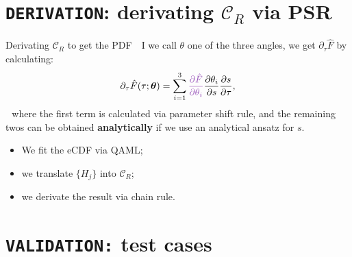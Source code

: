 \documentclass[8pt, xcolor={svgnames}, hyperref={colorlinks, linkcolor=black, citecolor=amethyst, urlcolor=amethyst}]{beamer}
\begin{document}
\section{\texttt{DERIVATION}: derivating $\mathcal{C}_R$ via PSR}


\begin{frame}{Derivating $\mathcal{C}_R$ to get the PDF}
\large
\faArrowCircleRight\,\, I we call $\theta$ one of the three angles, we get
$\partial_{\tau} \hat{F}$ by calculating:
\begin{equation}
  \partial_{\tau} \hat{F}(\tau; \bm{\theta}) = 
  \sum_{i=1}^3 \textcolor{amethyst}{\frac{\partial \hat{F}}{\partial\theta_i}} 
  \frac{\partial \theta_i}{\partial s} \frac{\partial s}{\partial \tau},
\end{equation}
\pause
\faArrowCircleRight\,\, where the \textcolor{amethyst}{first term} 
is calculated via parameter shift rule, and the remaining 
twos can be obtained \textbf{analytically} if we use an analytical ansatz for $s$.
\pause
\vspace{0.3cm}
\begin{tcolorbox}[colback=amethyst!15, title=Summary]
\begin{itemize}[noitemsep]
    \item[\faTerminal] We fit the eCDF via QAML;
    \item[\faTerminal] we translate $\{H_j \}$ into $\mathcal{C}_R$;
    \item[\faTerminal] we derivate the result via chain rule.
\end{itemize}
\end{tcolorbox}

\end{frame}

\section{\texttt{VALIDATION:} test cases}
\end{document}
